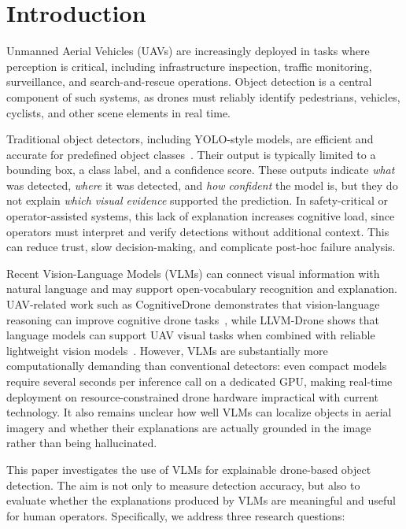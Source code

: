 \documentclass[acmtog, authorversion]{acmart}
\begin{document}
\section{Introduction}

Unmanned Aerial Vehicles (UAVs) are increasingly deployed in tasks
where perception is critical, including infrastructure inspection,
traffic monitoring, surveillance, and search-and-rescue operations.
Object detection is a central component of such systems, as drones
must reliably identify pedestrians, vehicles, cyclists, and other
scene elements in real time.

Traditional object detectors, including YOLO-style models, are
efficient and accurate for predefined object classes~\cite{redmon2016yolo}.
Their output is typically limited to a bounding box, a class label,
and a confidence score. These outputs indicate \emph{what} was
detected, \emph{where} it was detected, and \emph{how confident}
the model is, but they do not explain \emph{which visual evidence}
supported the prediction. In safety-critical or operator-assisted
systems, this lack of explanation increases cognitive load, since
operators must interpret and verify detections without additional
context. This can reduce trust, slow decision-making, and complicate
post-hoc failure analysis.

Recent Vision-Language Models (VLMs) can connect visual information
with natural language and may support open-vocabulary recognition and
explanation. UAV-related work such as CognitiveDrone demonstrates
that vision-language reasoning can improve cognitive drone
tasks~\cite{lykov2025cognitivedrone}, while LLVM-Drone shows that
language models can support UAV visual tasks when combined with
reliable lightweight vision models~\cite{hu2025llvmdrone}. However,
VLMs are substantially more computationally demanding than
conventional detectors: even compact models require several seconds
per inference call on a dedicated GPU, making real-time deployment on
resource-constrained drone hardware impractical with current
technology. It also remains unclear how well VLMs can localize
objects in aerial imagery and whether their explanations are actually
grounded in the image rather than being hallucinated.

This paper investigates the use of VLMs for explainable drone-based
object detection. The aim is not only to measure detection accuracy,
but also to evaluate whether the explanations produced by VLMs are
meaningful and useful for human operators. Specifically, we address
three research questions:
\end{document}
